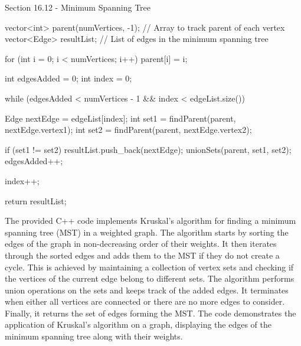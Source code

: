 \begin{notes}{Section 16.12 - Minimum Spanning Tree}
\begin{highlight}
\begin{code}[C++]
{        vector<int> parent(numVertices, -1); // Array to track parent of each vertex
        vector<Edge> resultList; // List of edges in the minimum spanning tree
    
        for (int i = 0; i < numVertices; i++) {
            parent[i] = i;
        }
    
        int edgesAdded = 0;
        int index = 0;
    
        while (edgesAdded < numVertices - 1 && index < edgeList.size()) {
            Edge nextEdge = edgeList[index];
            int set1 = findParent(parent, nextEdge.vertex1);
            int set2 = findParent(parent, nextEdge.vertex2);
    
            if (set1 != set2) {
                resultList.push_back(nextEdge);
                unionSets(parent, set1, set2);
                edgesAdded++;
            }
    
            index++;
        }
    
        return resultList;
    }
    \end{code}
        The provided C++ code implements Kruskal's algorithm for finding a minimum spanning tree (MST) in a weighted graph. The algorithm starts by sorting the edges of the graph in non-decreasing order of their weights. It then iterates 
        through the sorted edges and adds them to the MST if they do not create a cycle. This is achieved by maintaining a collection of vertex sets and checking if the vertices of the current edge belong to different sets. The algorithm 
        performs union operations on the sets and keeps track of the added edges. It terminates when either all vertices are connected or there are no more edges to consider. Finally, it returns the set of edges forming the MST. The code 
        demonstrates the application of Kruskal's algorithm on a graph, displaying the edges of the minimum spanning tree along with their weights.
    \end{highlight}
\end{notes}


